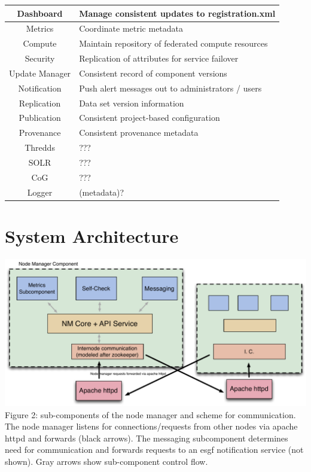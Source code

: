 \documentclass[oneside,12pt]{memoir}
\begin{document}
\begin{tabular}{|c|l|}
\hline
Dashboard &  Manage consistent updates to registration.xml \\
\hline
Metrics & Coordinate metric metadata \\
\hline
Compute & Maintain repository of federated compute resources \\
\hline
Security & Replication of attributes for service failover \\
\hline
Update Manager & Consistent record of component versions \\
\hline
Notification & Push alert messages out to administrators / users \\
\hline
Replication & Data set version information \\
\hline
Publication & Consistent project-based configuration \\
\hline
Provenance & Consistent provenance metadata \\
\hline
Thredds & ??? \\
\hline
SOLR & ??? \\
\hline
CoG & ??? \\
\hline
Logger & (metadata)? \\
\hline
\end{tabular}



\section{System Architecture}



\begin{center}
\includegraphics[width=\textwidth]{presentation/NM-design-v2.pdf}
Figure 2:  sub-components of the node manager and scheme for communication.  The node manager listens for connections/requests from other nodes via apache httpd and forwards (black arrows).  The messaging subcomponent determines need for communication and forwards requests to an esgf notification service (not shown).  Gray arrows show sub-component control flow.
\end{center}
\newpage
\end{document}
